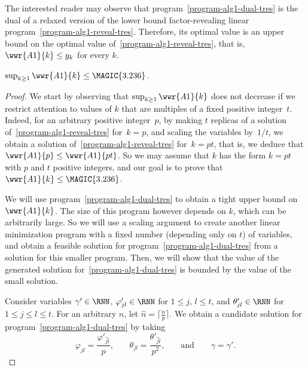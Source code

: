 The interested reader may observe that program~\eqref{program-alg1-dual-tres}
is the dual of a relaxed version of the lower bound factor-revealing
linear program~\eqref{program-alg1-reveal-tres}.  Therefore, its optimal value
is an upper bound on the optimal value of~\eqref{program-alg1-reveal-tres}, 
that is, $\wwr{A1}{k} \le y_k$ for every $k$.





\newcommand{\PasteLemmaAlgOneThreeTwoThree}{
$\sup_{k \geq 1}\wwr{A1}{k} \le \MAGIC{3.236}$.
}
\begin{lemma}\label{lemma-alg1-323}
\PasteLemmaAlgOneThreeTwoThree
\end{lemma}
\begin{proof}
  We start by observing that $\sup_{k \geq 1}\wwr{A1}{k}$ does not decrease if
  we restrict attention to values of $k$ that are multiples of a fixed
  positive integer~$t$. Indeed, for an arbitrary positive integer~$p$, by
  making $t$ replicas of a solution of~\eqref{program-alg1-reveal-tres}
  for~$k=p$, and scaling the variables by~$1/t$, we obtain a solution
  of~\eqref{program-alg1-reveal-tres} for~$k=pt$, that is, we deduce that
  $\wwr{A1}{p} \le \wwr{A1}{pt}$. So we may assume that $k$ has the form $k =
  pt$ with $p$ and $t$ positive integers, and our goal is to prove that 
  $\wwr{A1}{k} \le \MAGIC{3.236}$.

  We will use program~\eqref{program-alg1-dual-tres} to obtain a tight
  upper bound on $\wwr{A1}{k}$. The size of this program however
  depends on $k$, which can be arbitrarily large. So we will use a
  scaling argument to create another linear minimization program with
  a fixed number (depending only on $t$) of variables, and obtain a
  feasible solution for program~\eqref{program-alg1-dual-tres} from a
  solution for this smaller program. Then, we will show that the value
  of the generated solution for~\eqref{program-alg1-dual-tres} is
  bounded by the value of the small solution.

  Consider variables $\gamma' \in \RNN$, $\varphi'_{jl} \in \RNN$ for $1 \le
  j, \, l \le t$, and $\theta'_{jl} \in \RNN$ for $1 \le j \le l \le t$. For
  an arbitrary $n$, let $\hat{n} = \lceil \frac{n}{p} \rceil$. We obtain a
  candidate solution for program~\eqref{program-alg1-dual-tres} by taking
\begin{equation}\label{eq-alg1-323-vardef}
  \varphi_{jl} = \frac{\varphi'_{\hat{j} \hat{l}}}{p}
  \mbox{,}\qquad
  \theta_{jl} = \frac{\theta'_{\hat{j}\hat{l}}}{p^2}\mbox{,}
  \qquad\mbox{and}\qquad
  \gamma = \gamma'.
\end{equation}


\end{proof}
